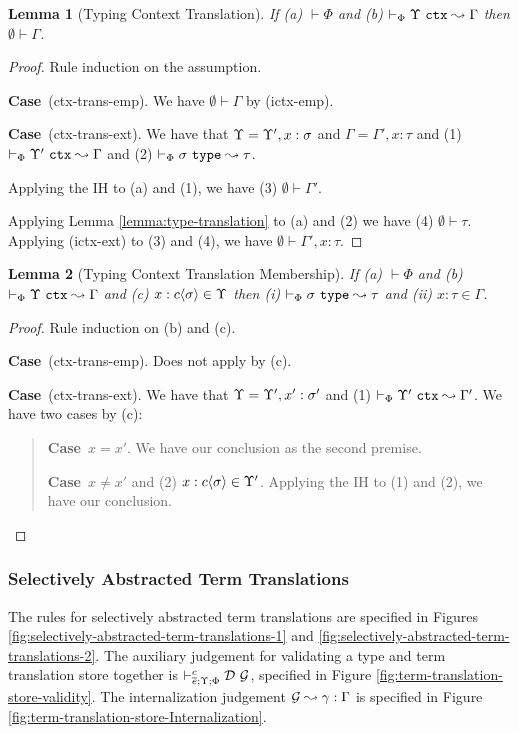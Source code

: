 \documentclass[12pt]{article}
\newtheorem{lemma}{Lemma}
\newcommand{\pfcase}[1]{\textbf{Case}~#1. }
\begin{document}
\begin{lemma}[Typing Context Translation]
If (a) $\vdash \Phi$ and (b) $\vdash_{\Phi} \Upsilon~\mathtt{ctx} \leadsto \Gamma$ then $\emptyset \vdash \Gamma$.\end{lemma}
\begin{proof} Rule induction on the assumption.

\pfcase{(ctx-trans-emp)} We have $\emptyset \vdash \Gamma$ by (ictx-emp).

\pfcase{(ctx-trans-ext)} We have that $\Upsilon=\Upsilon', x : \sigma$ and $\Gamma=\Gamma', x : \tau$ and (1) $\vdash_{\Phi} \Upsilon'~\mathtt{ctx} \leadsto \Gamma$ and (2) $\vdash_{\Phi} \sigma~\mathtt{type} \leadsto \tau$.

Applying the IH to (a) and (1), we have (3) $\emptyset \vdash \Gamma'$.

Applying Lemma \ref{lemma:type-translation} to (a) and (2) we have (4) $\emptyset \vdash \tau$. Applying (ictx-ext) to (3) and (4), we have $\emptyset \vdash \Gamma', x : \tau$.
\end{proof}

\begin{lemma}[Typing Context Translation Membership]
\label{lemma:typing-context-translation-membership}
If (a) $\vdash \Phi$ and (b) $\vdash_{\Phi} \Upsilon~\mathtt{ctx} \leadsto \Gamma$ and (c) $x : {c}\langle\sigma\rangle \in \Upsilon$ then (i) $\vdash_{\Phi} \sigma~\mathtt{type} \leadsto \tau$ and (ii) $x : \tau \in \Gamma$.
\end{lemma}
\begin{proof} Rule induction on (b) and (c).

\pfcase{(ctx-trans-emp)} Does not apply by (c).

\pfcase{(ctx-trans-ext)} We have that $\Upsilon=\Upsilon', x' : \sigma'$ and  (1) $\vdash_{\Phi} \Upsilon'~\mathtt{ctx} \leadsto \Gamma'$. We have two cases by (c):

\begin{quote}
    \pfcase{$x=x'$} We have our conclusion as the second premise.

    \pfcase{$x\neq x'$ and (2) $x : {c}\langle\sigma\rangle \in \Upsilon'$} Applying the IH to (1) and (2), we have our conclusion.
\end{quote}
\end{proof}

\subsubsection{Selectively Abstracted Term Translations}
The rules for selectively abstracted term translations are specified in Figures \ref{fig:selectively-abstracted-term-translations-1} and \ref{fig:selectively-abstracted-term-translations-2}. The auxiliary judgement for validating a type and term translation store together is $\vdash_{\overline{e}; \Upsilon; \Phi}^{c} \mathcal{D}~\mathcal{G}$, specified in Figure \ref{fig:term-translation-store-validity}. The internalization judgement $\mathcal{G} \leadsto \gamma : \Gamma$ is specified in Figure \ref{fig:term-translation-store-Internalization}.
\end{document}
